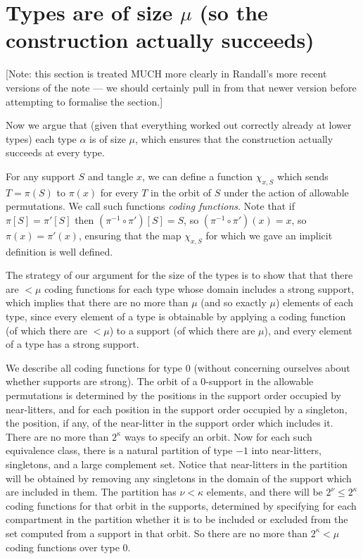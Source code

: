 \section{Types are of size \texorpdfstring{$\mu$}{μ} (so the construction actually succeeds)}

[Note: this section is treated MUCH more clearly in Randall’s more recent versions of the note — we should certainly pull in from that newer version before attempting to formalise the section.]

Now we argue that (given that everything worked out correctly already at lower types) each type $\alpha$ is of size $\mu$, which ensures
that the construction actually succeeds at every type.

\begin{definition}
\label {def:coding-function}
For any support $S$ and tangle $x$, we can define a function $\chi_{x,S}$ which sends $T=\pi(S)$ to $\pi(x)$ for every $T$ in the orbit of $S$ under
the action of allowable permutations.  We call such functions {\em coding functions\/}.  Note that if $\pi[S]=\pi'[S]$ then $(\pi^{-1}\circ \pi')[S]= S$, so
$(\pi^{-1}\circ \pi')(x)= x$, so $\pi(x)=\pi'(x)$, ensuring that the map $\chi_{x,S}$ for which we gave an implicit definition is well defined.
\end{definition}

The strategy of our argument for the size of the types is to show that that there are $<\mu$ coding functions for each type whose domain includes a strong support, which implies that there are no more than $\mu$ (and so exactly $\mu$) elements of each type, since every element of a type is obtainable by applying a coding function (of which there are $<\mu$) to a support (of which there are $\mu$), and every element of a type has a strong support.

We describe all coding functions for type 0 (without concerning ourselves about whether supports are strong).  The orbit of a 0-support in the allowable permutations is determined by the positions in the support order occupied by near-litters, and for each position in the support order occupied by a singleton, the position, if any, of the near-litter in the support order which includes it.  There are no more than $2^\kappa$ ways to specify an orbit.  Now for each such equivalence class, there is a natural partition of type $-1$ into near-litters, singletons, and a large complement set.  Notice that near-litters in the partition will be obtained by removing any singletons in the domain of the support which are included in them.  The partition has $\nu<\kappa$ elements, and there will be $2^\nu\leq 2^\kappa$ coding functions for that orbit in the supports, determined by specifying for each compartment in the partition whether it is to be included or excluded from the set computed from a support in that orbit.  So there are no more than $2^\kappa<\mu$ coding functions over type 0.

